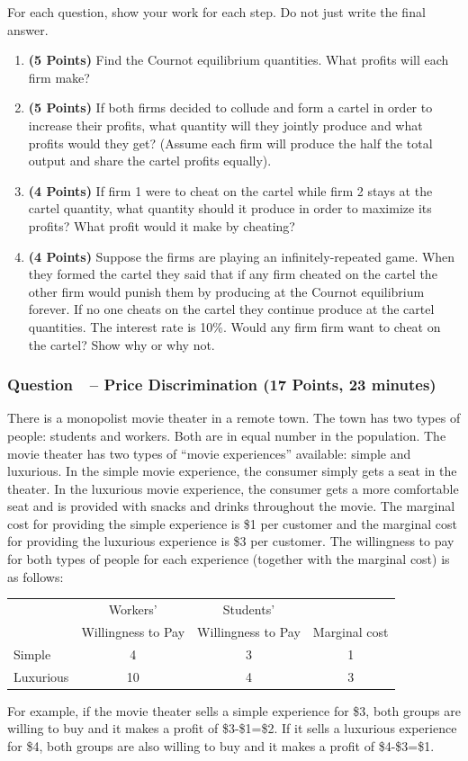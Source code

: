 \documentclass[11pt]{article}
\newcounter{question}[section]
\newcommand{\question}[1]{\refstepcounter{question}
  \subsubsection*{Question~\thequestion~-- #1}}
\newenvironment{subquestions}{
  \begin{enumerate}[label=(\roman*)]}{\end{enumerate}}
\begin{document}
For each question, show your work for each step. Do not just write the final answer.
\begin{subquestions}
  \item \textbf{(5 Points)} Find the Cournot equilibrium quantities. What profits will each firm make?
  \item \textbf{(5 Points)} If both firms decided to collude and form a cartel in order to increase their profits, what quantity will they jointly produce and what profits would they get? (Assume each firm will produce the half the total output and share the cartel profits equally).
  \item \textbf{(4 Points)} If firm 1 were to cheat on the cartel while firm 2 stays at the cartel quantity, what quantity should it produce in order to maximize its profits? What profit would it make by cheating?
  \item \textbf{(4 Points)} Suppose the firms are playing an infinitely-repeated game. When they formed the cartel they said that if any firm cheated on the cartel the other firm would punish them by producing at the Cournot equilibrium forever. If no one cheats on the cartel they continue produce at the cartel quantities. The interest rate is 10\%. Would any firm firm want to cheat on the cartel? Show why or why not.
\end{subquestions}

\question{Price Discrimination (17 Points, 23 minutes)}
There is a monopolist movie theater in a remote town. The town has two types of people: students and workers. Both are in equal number in the population. The movie theater has two types of ``movie experiences'' available: simple and luxurious. In the simple movie experience, the consumer simply gets a seat in the theater. In the luxurious movie experience, the consumer gets a more comfortable seat and is provided with snacks and drinks throughout the movie. The marginal cost for providing the simple experience is \$1 per customer and the marginal cost for providing the luxurious experience is \$3 per customer. The willingness to pay for both types of people for each experience (together with the marginal cost) is as follows:

\begin{center}
  \begin{tabular}{l|cc|c|}\hline\hline
    & Workers' & Students' &\\
    & Willingness to Pay & Willingness to Pay & Marginal cost\\ \hline
    Simple & 4 & 3 & 1 \\
    Luxurious & 10 & 4 & 3 \\ \hline\hline
  \end{tabular}
\end{center}
For example, if the movie theater sells a simple experience for \$3, both groups are willing to buy and it makes a profit of \$3-\$1=\$2. If it sells a luxurious experience for \$4, both groups are also willing to buy and it makes a profit of \$4-\$3=\$1.
\end{document}
